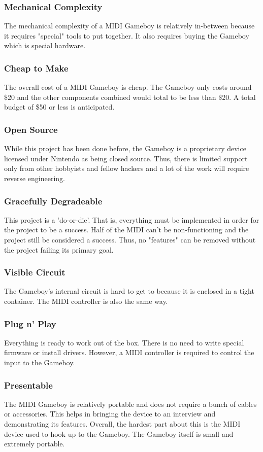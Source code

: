 \documentclass{article}
\begin{document}
\subsubsection {Mechanical Complexity}
The mechanical complexity of a MIDI Gameboy is relatively in-between
because it requires "special" tools to put together. It also requires
buying the Gameboy which is special hardware.
\subsubsection{Cheap to Make}
The overall cost of a MIDI Gameboy is cheap. The Gameboy only costs
around \$20 and the other components combined would total to be less
than \$20. A total budget of \$50 or less is anticipated.
\subsubsection{Open Source}
While this project has been done before, the Gameboy is a proprietary
device licensed under Nintendo as being closed source. Thus, there is
limited support only from other hobbyists and fellow hackers and a lot
of the work will require reverse engineering.
\subsubsection{Gracefully Degradeable}
This project is a 'do-or-die'. That is, everything must be implemented
in order for the project to be a success. Half of the MIDI can't be
non-functioning and the project still be considered a success. Thus,
no "features" can be removed without the project failing its primary
goal.
\subsubsection{Visible Circuit}
The Gameboy's internal circuit is hard to get to because it is
enclosed in a tight container. The MIDI controller is also the same
way.
\subsubsection{Plug n' Play}
Everything is ready to work out of the box. There is no need to write
special firmware or install drivers. However, a MIDI controller is
required to control the input to the Gameboy.
\subsubsection{Presentable}
The MIDI Gameboy is relatively portable and does not require a bunch
of cables or accessories. This helps in bringing the device to an
interview and demonstrating its features. Overall, the hardest part
about this is the MIDI device used to hook up to the Gameboy. The
Gameboy itself is small and extremely portable.
\end{document}

